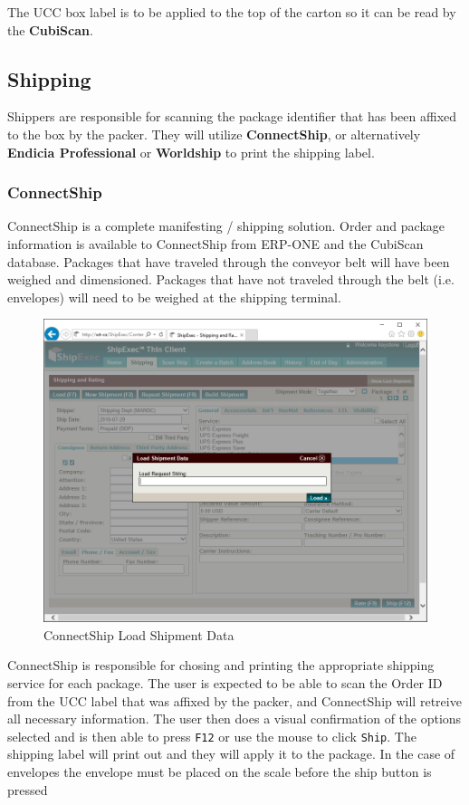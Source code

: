 The UCC box label is to be applied to the top of the carton so it can be read by the \textbf{CubiScan}.

\pagebreak

\subsection{Shipping}

Shippers are responsible for scanning the package identifier that has been affixed to the box by the packer.  They will utilize \textbf{ConnectShip}, or alternatively \textbf{Endicia Professional} or \textbf{Worldship} to print the shipping label.

\subsubsection{ConnectShip}

ConnectShip is a complete manifesting / shipping solution. Order and package information is available to ConnectShip from ERP-ONE and the CubiScan database. Packages that have traveled through the conveyor belt will have been weighed and dimensioned. Packages that have not traveled through the belt (i.e. envelopes) will need to be weighed at the shipping terminal.

\begin{figure}[H]
\includegraphics[width=\textwidth]{../img/image43}
\caption{ConnectShip Load Shipment Data}
\end{figure}

ConnectShip is responsible for chosing and printing the appropriate shipping service for each package.  The user is expected to be able to scan the Order ID from the UCC label that was affixed by the packer, and ConnectShip will retreive all necessary information. The user then does a visual confirmation of the options selected and is then able to press \texttt{F12} or use the mouse to click \texttt{Ship}.  The shipping label will print out and they will apply it to the package. In the case of envelopes the envelope must be placed on the scale before the ship button is pressed


